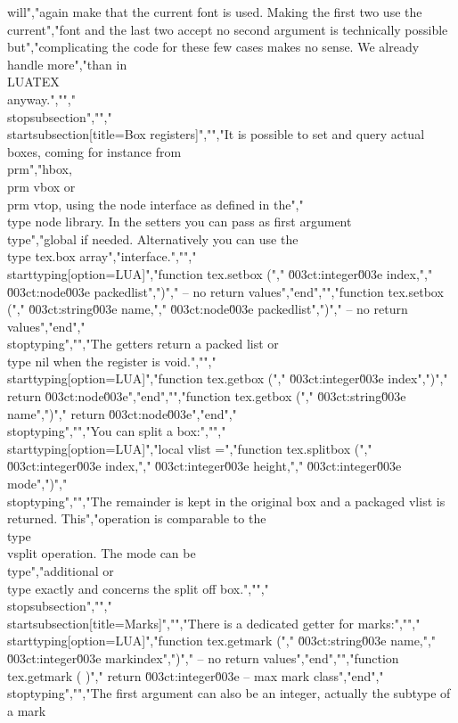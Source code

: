 will","again make that the current font is used. Making the first two use the current","font and the last two accept no second argument is technically possible but","complicating the code for these few cases makes no sense. We already handle more","than in \\LUATEX\\ anyway.","","\\stopsubsection","","\\startsubsection[title={Box registers}]","","It is possible to set and query actual boxes, coming for instance from \\prm","{hbox}, \\prm {vbox} or \\prm {vtop}, using the node interface as defined in the","\\type {node} library. In the setters you can pass as first argument \\type","{global} if needed. Alternatively you can use the \\type {tex.box} array","interface.","","\\starttyping[option=LUA]","function tex.setbox (","    \u003ct:integer\u003e index,","    \u003ct:node\u003e    packedlist",")","    -- no return values","end","","function tex.setbox (","    \u003ct:string\u003e name,","    \u003ct:node\u003e   packedlist",")","    -- no return values","end","\\stoptyping","","The getters return a packed list or \\type {nil} when the register is void.","","\\starttyping[option=LUA]","function tex.getbox (","    \u003ct:integer\u003e index",")","    return \u003ct:node\u003e","end","","function tex.getbox (","    \u003ct:string\u003e name",")","    return \u003ct:node\u003e","end","\\stoptyping","","You can split a box:","","\\starttyping[option=LUA]","local vlist =","function tex.splitbox (","    \u003ct:integer\u003e index,","    \u003ct:integer\u003e height,","    \u003ct:integer\u003e mode",")","\\stoptyping","","The remainder is kept in the original box and a packaged vlist is returned. This","operation is comparable to the \\type {\\vsplit} operation. The mode can be \\type","{additional} or \\type {exactly} and concerns the split off box.","","\\stopsubsection","","\\startsubsection[title=Marks]","","There is a dedicated getter for marks:","","\\starttyping[option=LUA]","function tex.getmark (","    \u003ct:string\u003e  name,","    \u003ct:integer\u003e markindex",")","    -- no return values","end","","function tex.getmark ( )","    return \u003ct:integer\u003e -- max mark class","end","\\stoptyping","","The first argument can also be an integer, actually the subtype of a mark 